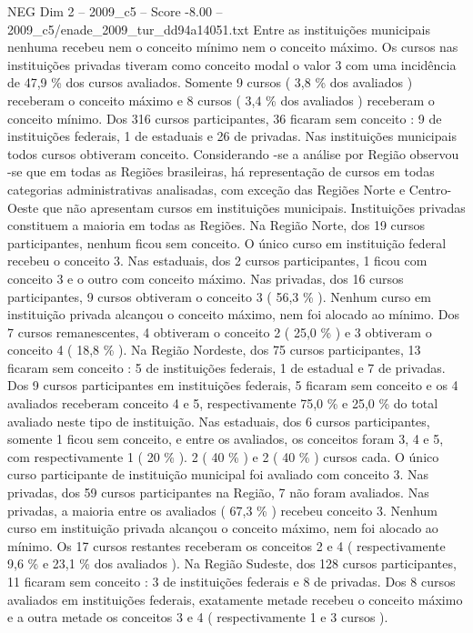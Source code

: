 \begin{textsample}{NEG Dim 2 – 2009\_c5 – Score -8.00 – 2009\_c5/enade\_2009\_tur\_dd94a14051.txt}
Entre as instituições municipais nenhuma recebeu nem o conceito mínimo nem o conceito máximo.
Os cursos nas instituições privadas tiveram como conceito modal o valor 3 com uma incidência de 47,9 \% dos cursos avaliados.
Somente 9 cursos ( 3,8 \% dos avaliados ) receberam o conceito máximo e 8 cursos ( 3,4 \% dos avaliados ) receberam o conceito mínimo.
Dos 316 cursos participantes, 36 ficaram sem conceito : 9 de instituições federais, 1 de estaduais e 26 de privadas.
Nas instituições municipais todos cursos obtiveram conceito.
Considerando -se a análise por Região observou -se que em todas as Regiões brasileiras, há representação de cursos em todas categorias administrativas analisadas, com exceção das Regiões Norte e Centro-Oeste que não apresentam cursos em instituições municipais.
Instituições privadas constituem a maioria em todas as Regiões.
Na Região Norte, dos 19 cursos participantes, nenhum ficou sem conceito.
O único curso em instituição federal recebeu o conceito 3.
Nas estaduais, dos 2 cursos participantes, 1 ficou com conceito 3 e o outro com conceito máximo.
Nas privadas, dos 16 cursos participantes, 9 cursos obtiveram o conceito 3 ( 56,3 \% ).
Nenhum curso em instituição privada alcançou o conceito máximo, nem foi alocado ao mínimo.
Dos 7 cursos remanescentes, 4 obtiveram o conceito 2 ( 25,0 \% ) e 3 obtiveram o conceito 4 ( 18,8 \% ).
Na Região Nordeste, dos 75 cursos participantes, 13 ficaram sem conceito : 5 de instituições federais, 1 de estadual e 7 de privadas.
Dos 9 cursos participantes em instituições federais, 5 ficaram sem conceito e os 4 avaliados receberam conceito 4 e 5, respectivamente 75,0 \% e 25,0 \% do total avaliado neste tipo de instituição.
Nas estaduais, dos 6 cursos participantes, somente 1 ficou sem conceito, e entre os avaliados, os conceitos foram 3, 4 e 5, com respectivamente 1 ( 20 \% ). 2 ( 40 \% ) e 2 ( 40 \% ) cursos cada.
O único curso participante de instituição municipal foi avaliado com conceito 3.
Nas privadas, dos 59 cursos participantes na Região, 7 não foram avaliados.
Nas privadas, a maioria entre os avaliados ( 67,3 \% ) recebeu conceito 3.
Nenhum curso em instituição privada alcançou o conceito máximo, nem foi alocado ao mínimo.
Os 17 cursos restantes receberam os conceitos 2 e 4 ( respectivamente 9,6 \% e 23,1 \% dos avaliados ).
Na Região Sudeste, dos 128 cursos participantes, 11 ficaram sem conceito : 3 de instituições federais e 8 de privadas.
Dos 8 cursos avaliados em instituições federais, exatamente metade recebeu o conceito máximo e a outra metade os conceitos 3 e 4 ( respectivamente 1 e 3 cursos ).

\end{textsample}
